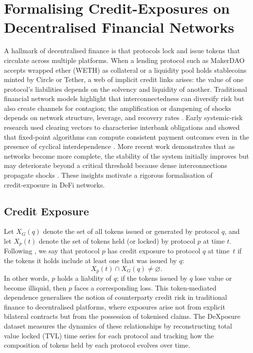 \section{Formalising Credit-Exposures on Decentralised Financial Networks}

A hallmark of decentralised finance is that protocols lock and issue tokens that circulate across multiple platforms.  When a lending protocol such as MakerDAO accepts wrapped ether (WETH) as collateral or a liquidity pool holds stablecoins minted by Circle or Tether, a web of implicit credit links arises: the value of one protocol’s liabilities depends on the solvency and liquidity of another.  Traditional financial network models highlight that interconnectedness can diversify risk but also create channels for contagion; the amplification or dampening of shocks depends on network structure, leverage, and recovery rates \cite{Glasserman2016}.  Early systemic‑risk research used clearing vectors to characterise interbank obligations and showed that fixed‑point algorithms can compute consistent payment outcomes even in the presence of cyclical interdependence \cite{EisenbergNoe2001}.  More recent work demonstrates that as networks become more complete, the stability of the system initially improves but may deteriorate beyond a critical threshold because dense interconnections propagate shocks \cite{Acemoglu2013}.  These insights motivate a rigorous formalisation of credit‑exposure in DeFi networks.

\subsection{Credit Exposure}

Let $X_G(q)$ denote the set of all tokens issued or generated by protocol $q$, and let $X_p(t)$ denote the set of tokens held (or locked) by protocol $p$ at time $t$.  Following \cite{wu2025}, we say that protocol $p$ has {credit exposure} to protocol $q$ at time~$t$ if the tokens it holds include at least one that was issued by $q$:
\begin{equation}
X_p(t)\cap X_G(q)\neq \varnothing.
\label{eq:credit-exposure-definition}
\end{equation}
In other words, $p$ holds a liability of $q$; if the tokens issued by $q$ lose value or become illiquid, then $p$ faces a corresponding loss.  This token‑mediated dependence generalises the notion of counterparty credit risk in traditional finance to decentralised platforms, where exposures arise not from explicit bilateral contracts but from the possession of tokenised claims.  The DeXposure dataset measures the dynamics of these relationships by reconstructing total value locked (TVL) time series for each protocol and tracking how the composition of tokens held by each protocol evolves over time.

